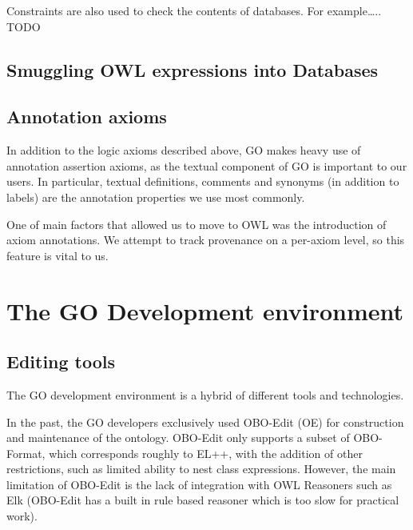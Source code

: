 \documentclass{llncs}
\begin{document}
Constraints are also used to check the contents of databases. For
example….. TODO

\subsection{Smuggling OWL expressions into Databases}


\cite{Huntley2014}

\subsection{Annotation axioms}

In addition to the logic axioms described above, GO makes heavy use of
annotation assertion axioms, as the textual component of GO is
important to our users. In particular, textual definitions, comments
and synonyms (in addition to labels) are the annotation properties we
use most commonly.

One of main factors that allowed us to move to OWL was the
introduction of axiom annotations. We attempt to track provenance on a
per-axiom level, so this feature is vital to us.

\section{The GO Development environment}

\subsection{Editing tools}

The GO development environment is a hybrid of different tools and
technologies.

In the past, the GO developers exclusively used
OBO-Edit (OE)\cite{Day-Richter2007} for construction and maintenance of the
ontology. OBO-Edit only supports a subset of OBO-Format, which
corresponds roughly to EL++, with the addition of other restrictions,
such as limited ability to nest class expressions. However, the main
limitation of OBO-Edit is the lack of integration with OWL Reasoners
such as Elk (OBO-Edit has a built in rule based reasoner which is too
slow for practical work).
\end{document}
